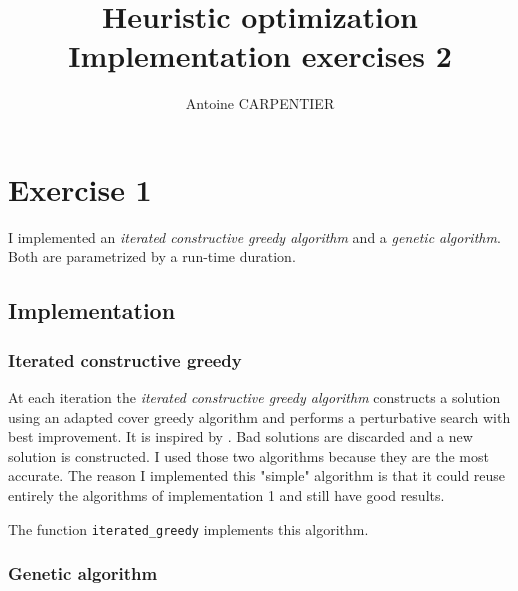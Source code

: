 \documentclass[a4paper,12pt]{article}
\author{Antoine CARPENTIER}
\title{Heuristic optimization\\ \small Implementation exercises 2}
\begin{document}
\maketitle

\section{Exercise 1}

I implemented an \textit{iterated constructive greedy algorithm} and a \textit{genetic algorithm}. Both are parametrized by a run-time duration.

\subsection{Implementation}

\subsubsection{Iterated constructive greedy}

At each iteration the \textit{iterated constructive greedy algorithm} constructs a solution using an adapted cover greedy algorithm and performs a perturbative search with best improvement. It is inspired by \cite{resende2009greedy}. Bad solutions are discarded and a new solution is constructed.
I used those two algorithms because they are the most accurate.
The reason I implemented this "simple" algorithm is that it could reuse entirely the algorithms of implementation 1 and still have good results.

The function \texttt{iterated\_greedy} implements this algorithm.

\subsubsection{Genetic algorithm}
\end{document}
